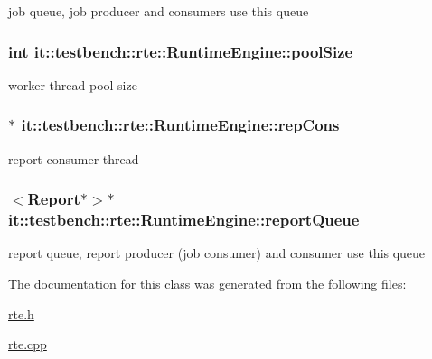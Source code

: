 job queue, job producer and consumers use this queue \hypertarget{classit_1_1testbench_1_1rte_1_1RuntimeEngine_a5e3a4289803ed9c4336285b170259c10}{
\subsubsection[{pool\-Size}]{\setlength{\rightskip}{0pt plus 5cm}int it\-::testbench\-::rte\-::\-Runtime\-Engine\-::pool\-Size\hspace{0.3cm}{\ttfamily [private]}}}\label{d9/d54/classit_1_1testbench_1_1rte_1_1RuntimeEngine_a5e3a4289803ed9c4336285b170259c10}
worker thread pool size \hypertarget{classit_1_1testbench_1_1rte_1_1RuntimeEngine_ab909a196ca42077e83c532959ec15850}{
\subsubsection[{rep\-Cons}]{$\ast$ it\-::testbench\-::rte\-::\-Runtime\-Engine\-::rep\-Cons\hspace{0.3cm}{\ttfamily [private]}}}\label{d9/d54/classit_1_1testbench_1_1rte_1_1RuntimeEngine_ab909a196ca42077e83c532959ec15850}
report consumer thread \hypertarget{classit_1_1testbench_1_1rte_1_1RuntimeEngine_aade3dfdae545b1bffdac3b2f2b82d1a9}{
\subsubsection[{report\-Queue}]{$<${\bf Report}$\ast$$>$$\ast$ it\-::testbench\-::rte\-::\-Runtime\-Engine\-::report\-Queue\hspace{0.3cm}{\ttfamily [private]}}}\label{d9/d54/classit_1_1testbench_1_1rte_1_1RuntimeEngine_aade3dfdae545b1bffdac3b2f2b82d1a9}
report queue, report producer (job consumer) and consumer use this queue 

The documentation for this class was generated from the following files\-:\begin{DoxyCompactItemize}
\item 
\hyperlink{rte_8h}{rte.\-h}\item 
\hyperlink{rte_8cpp}{rte.\-cpp}\end{DoxyCompactItemize}
